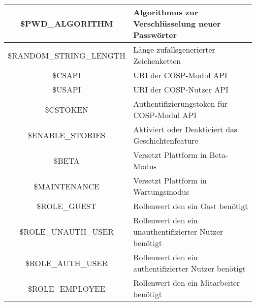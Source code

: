 \begin{longtable}[H]{|c|p{8cm}|}
	\$PWD\_ALGORITHM          & Algorithmus zur Verschlüsselung neuer Passwörter                                                                                                     \\ \hline	
	\$RANDOM\_STRING\_LENGTH  & Länge zufallsgenerierter Zeichenketten                                                                                                     \\ \hline	
	\$CSAPI                   & URI der {\glqq COSP\grqq}-Modul API                                                                                                     \\ \hline
	\$USAPI                   & URI der {\glqq COSP\grqq}-Nutzer API                                                                                                     \\ \hline
	\$CSTOKEN                 & Authentifizierungstoken für {\glqq COSP\grqq}-Modul API                                                                                                \\ \hline
	\$ENABLE\_STORIES         & Aktiviert oder Deakticiert das Geschichtenfeature                                                                                                \\ \hline	
	\$BETA                    & Versetzt Plattform in Beta-Modus                                                                                                     \\ \hline	
	\$MAINTENANCE             & Versetzt Plattform in Wartungsmodus                                                                                                     \\ \hline	
	\$ROLE\_GUEST             & Rollenwert den ein Gast benötigt                                                                                                    \\ \hline	
	\$ROLE\_UNAUTH\_USER      & Rollenwert den ein unauthentifizierter Nutzer benötigt                                                                                                    \\ \hline	
	\$ROLE\_AUTH\_USER        & Rollenwert den ein authentifizierter Nutzer benötigt                                                                                                    \\ \hline	
	\$ROLE\_EMPLOYEE          & Rollenwert den ein Mitarbeiter benötigt                                                                                                    \\ \hline	

\end{longtable}
